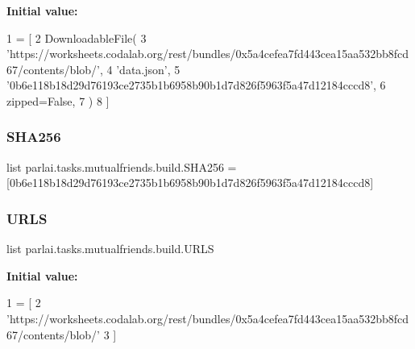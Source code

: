 {\bfseries Initial value\+:}
\begin{DoxyCode}
1 =  [
2     DownloadableFile(
3         \textcolor{stringliteral}{'https://worksheets.codalab.org/rest/bundles/0x5a4cefea7fd443cea15aa532bb8fcd67/contents/blob/'},
4         \textcolor{stringliteral}{'data.json'},
5         \textcolor{stringliteral}{'0b6e118b18d29d76193ce2735b1b6958b90b1d7d826f5963f5a47d12184cccd8'},
6         zipped=\textcolor{keyword}{False},
7     )
8 ]
\end{DoxyCode}
\mbox{\label{namespaceparlai_1_1tasks_1_1mutualfriends_1_1build_ab9cd02d644e79e164de95191d87f9d65}} 
\subsubsection{\texorpdfstring{S\+H\+A256}{SHA256}}
{\footnotesize\ttfamily list parlai.\+tasks.\+mutualfriends.\+build.\+S\+H\+A256 = \mbox{[}\textquotesingle{}0b6e118b18d29d76193ce2735b1b6958b90b1d7d826f5963f5a47d12184cccd8\textquotesingle{}\mbox{]}}

\mbox{\label{namespaceparlai_1_1tasks_1_1mutualfriends_1_1build_a56fb564b47a2286653d1738634a3b0f0}} 
\subsubsection{\texorpdfstring{U\+R\+LS}{URLS}}
{\footnotesize\ttfamily list parlai.\+tasks.\+mutualfriends.\+build.\+U\+R\+LS}

{\bfseries Initial value\+:}
\begin{DoxyCode}
1 =  [
2     \textcolor{stringliteral}{'https://worksheets.codalab.org/rest/bundles/0x5a4cefea7fd443cea15aa532bb8fcd67/contents/blob/'}
3 ]
\end{DoxyCode}
